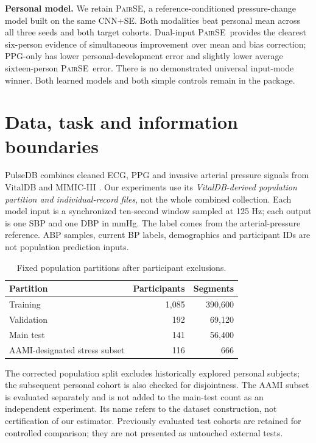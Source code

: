 \documentclass[conference]{IEEEtran}
\newcommand{\pair}{\textsc{PairSE}}
\begin{document}
\textbf{Personal model.} We retain \pair, a reference-conditioned pressure-change
model built on the same CNN+SE. Both modalities beat personal mean across all
three seeds and both target cohorts. Dual-input \pair\ provides the clearest
six-person evidence of simultaneous improvement over mean and bias correction;
PPG-only has lower personal-development error and slightly lower average
sixteen-person \pair\ error. There is no demonstrated universal input-mode
winner. Both learned models and both simple controls remain in the package.

\section{Data, task and information boundaries}
PulseDB combines cleaned ECG, PPG and invasive arterial pressure signals from
VitalDB and MIMIC-III \cite{wang2023pulsedb}. Our experiments use its
\emph{VitalDB-derived population partition and individual-record files}, not
the whole combined collection. Each model input is a synchronized ten-second
window sampled at 125 Hz; each output is one SBP and one DBP in mmHg. The label
comes from the arterial-pressure reference. ABP samples, current BP labels,
demographics and participant IDs are not population prediction inputs.

\begin{table}[t]\centering
\caption{Fixed population partitions after participant exclusions.}
\label{tab:data}\small
\begin{tabular}{lrr}\toprule
Partition & Participants & Segments\\\midrule
Training & 1,085 & 390,600\\
Validation & 192 & 69,120\\
Main test & 141 & 56,400\\
AAMI-designated stress subset & 116 & 666\\\bottomrule
\end{tabular}\end{table}

The corrected population split excludes historically explored personal subjects;
the subsequent personal cohort is also checked for disjointness. The AAMI
subset is evaluated separately and is not added to the main-test count as an
independent experiment. Its name refers to the dataset construction, not
certification of our estimator. Previously evaluated test cohorts are retained
for controlled comparison; they are not presented as untouched external tests.
\end{document}
